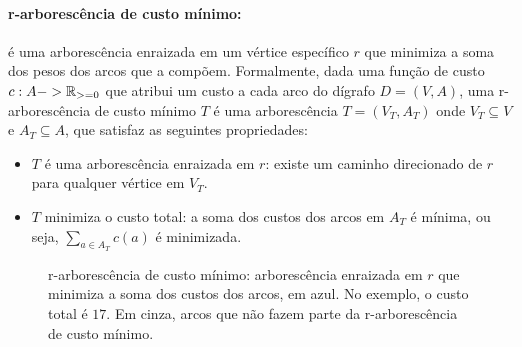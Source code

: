 \documentclass[12pt,a4paper]{article}
\def\geq{\string>=}%
\def\to{->}%
\begin{document}
\paragraph{r-arborescência de custo mínimo:}
é uma arborescência enraizada em um vértice específico \(r\) que minimiza a soma dos pesos dos arcos que a compõem. Formalmente, dada uma função de custo \(c: A \to \mathbb{R}_{\geq 0}\) que atribui um custo a cada arco do dígrafo \(D = (V, A)\), uma r-arborescência de custo mínimo \(T\) é uma arborescência \(T = (V_T, A_T)\) onde \(V_T \subseteq V\) e \(A_T \subseteq A\), que satisfaz as seguintes propriedades:
\begin{itemize}
    \item \(T\) é uma arborescência enraizada em \(r\): existe um caminho direcionado de \(r\) para qualquer vértice em \(V_T\).
    \item \(T\) minimiza o custo total: a soma dos custos dos arcos em \(A_T\) é mínima, ou seja, \(\sum_{a \in A_T} c(a)\) é minimizada.
\end{itemize}
\begin{figure}[H]
\centering
{}
\caption{r-arborescência de custo mínimo: arborescência enraizada em $r$ que minimiza a soma dos custos dos arcos, em azul. No exemplo, o custo total é $17$. Em cinza, arcos que não fazem parte da r-arborescência de custo mínimo.}
\label{fig:r-arborescencia-custo-minimo}
\end{figure}
\end{document}
